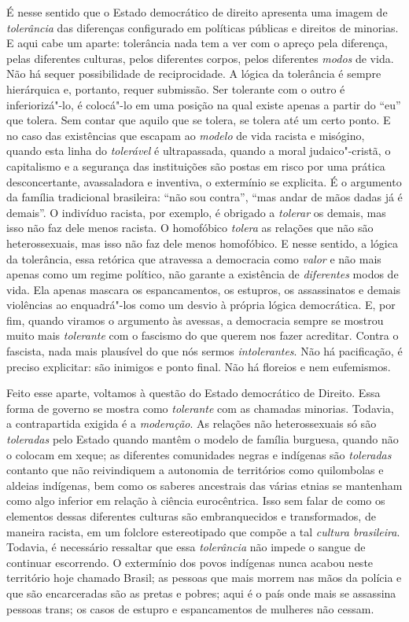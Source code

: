 É nesse sentido que o Estado democrático de direito apresenta uma imagem
de \emph{tolerância} das diferenças configurado em políticas públicas e
direitos de minorias. E aqui cabe um aparte: tolerância nada tem a ver
com o apreço pela diferença, pelas diferentes culturas, pelos diferentes
corpos, pelos diferentes \emph{modos} de vida. Não há sequer
possibilidade de reciprocidade. A lógica da tolerância é sempre
hierárquica e, portanto, requer submissão. Ser tolerante com o outro é
inferiorizá"-lo, é colocá"-lo em uma posição na qual existe apenas a
partir do ``eu'' que tolera. Sem contar que aquilo que se tolera, se
tolera até um certo ponto. E no caso das existências que escapam ao
\emph{modelo} de vida racista e misógino, quando esta linha do
\emph{tolerável} é ultrapassada, quando a moral judaico"-cristã, o
capitalismo e a segurança das instituições são postas em risco por uma
prática desconcertante, avassaladora e inventiva, o extermínio se
explicita. É o argumento da família tradicional brasileira: ``não sou
contra'', ``mas andar de mãos dadas já é demais''. O indivíduo racista,
por exemplo, é obrigado a \emph{tolerar} os demais, mas isso não faz
dele menos racista. O homofóbico \emph{tolera} as relações que não são
heterossexuais, mas isso não faz dele menos homofóbico. E nesse sentido,
a lógica da tolerância, essa retórica que atravessa a democracia como
\emph{valor} e não mais apenas como um regime político, não garante a
existência de \emph{diferentes} modos de vida. Ela apenas mascara os
espancamentos, os estupros, os assassinatos e demais violências ao
enquadrá"-los como um desvio à própria lógica democrática. E, por fim,
quando viramos o argumento às avessas, a democracia sempre se mostrou
muito mais \emph{tolerante} com o fascismo do que querem nos fazer
acreditar. Contra o fascista, nada mais plausível do que nós sermos
\emph{intolerantes}. Não há pacificação, é preciso explicitar: são
inimigos e ponto final. Não há floreios e nem eufemismos.

Feito esse aparte, voltamos à questão do Estado democrático de Direito.
Essa forma de governo se mostra como \emph{tolerante} com as chamadas
minorias. Todavia, a contrapartida exigida é a \emph{moderação}. As
relações não heterossexuais só são \emph{toleradas} pelo Estado quando
mantêm o modelo de família burguesa, quando não o colocam em xeque; as
diferentes comunidades negras e indígenas são \emph{toleradas} contanto
que não reivindiquem a autonomia de territórios como quilombolas e
aldeias indígenas, bem como os saberes ancestrais das várias etnias se
mantenham como algo inferior em relação à ciência eurocêntrica. Isso sem
falar de como os elementos dessas diferentes culturas são embranquecidos
e transformados, de maneira racista, em um folclore estereotipado que
compõe a tal \emph{cultura brasileira}. Todavia, é necessário ressaltar
que essa \emph{tolerância} não impede o sangue de continuar escorrendo.
O extermínio dos povos indígenas nunca acabou neste território hoje
chamado Brasil; as pessoas que mais morrem nas mãos da polícia e que são
encarceradas são as pretas e pobres; aqui é o país onde mais se
assassina pessoas trans; os casos de estupro e espancamentos de mulheres
não cessam.

